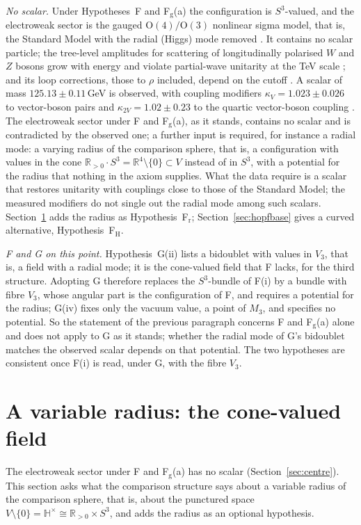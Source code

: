 \documentclass[aps,pra,onecolumn,superscriptaddress,nofootinbib,10pt]{revtex4-2}
\theoremstyle{definition}
\theoremstyle{remark}
\newcommand{\R}{\mathbb{R}}
\newcommand{\HH}{\mathbb{H}}
\newcommand{\OO}{\mathrm{O}}
\begin{document}
\smallskip\noindent\emph{No scalar.}  Under Hypotheses~F and F$_{\mathrm g}$(a) the configuration is $S^3$-valued, and the
electroweak sector is the gauged $\OO(4)/\OO(3)$ nonlinear sigma model, that is, the Standard Model with the
radial (Higgs) mode removed \cite{AB80}.  It contains no scalar particle; the tree-level amplitudes for
scattering of longitudinally polarised $W$ and $Z$ bosons grow with energy and violate partial-wave
unitarity at the TeV scale \cite{LQT77}; and its loop corrections, those to $\rho$ included, depend on the
cutoff \cite{AB80}.  A scalar of mass $125.13\pm0.11$\,GeV is observed, with coupling modifiers
$\kappa_V=1.023\pm0.026$ to vector-boson pairs and $\kappa_{2V}=1.02\pm0.23$ to the quartic vector-boson coupling
\cite{ex-PDG26}.  The electroweak sector under F and F$_{\mathrm g}$(a), as it stands, contains no scalar and is
contradicted by the observed one; a further input is required, for instance a radial mode: a varying
radius of the comparison sphere, that is, a configuration with values in the cone
$\R_{>0}\cdot S^3=\R^4\setminus\{0\}\subset V$ instead of in $S^3$, with a potential for the radius that nothing in the axiom
supplies.  What the data require is a scalar that restores unitarity with couplings close to those of the
Standard Model; the measured modifiers do not single out the radial mode among such scalars.  Section~\ref{sec:radial}
adds the radius as Hypothesis~F$_{\mathrm r}$; Section~\ref{sec:hopfbase} gives a curved alternative, Hypothesis~F$_{\mathrm H}$.

\smallskip\noindent\emph{F and G on this point.}  Hypothesis~G(ii) lists a bidoublet with values in $V_3$, that is,
a field with a radial mode; it is the cone-valued field that F lacks, for the third structure.  Adopting
G therefore replaces the $S^3$-bundle of F(i) by a bundle with fibre $V_3$, whose angular part is the
configuration of F, and requires a potential for the radius; G(iv) fixes only the vacuum value, a point of
$M_3$, and specifies no potential.  So the statement of the previous paragraph concerns F and F$_{\mathrm g}$(a)
alone and does not apply to G as it stands; whether the radial mode of G's bidoublet matches the
observed scalar depends on that potential.  The two hypotheses are consistent once F(i) is read, under
G, with the fibre $V_3$.


\section{A variable radius: the cone-valued field}\label{sec:radial}
The electroweak sector under F and F$_{\mathrm g}$(a) has no scalar (Section~\ref{sec:centre}).  This section
asks what the comparison structure says about a variable radius of the comparison sphere, that is,
about the punctured space $V\setminus\{0\}=\HH^\times\cong\R_{>0}\times S^3$, and adds the radius as an optional hypothesis.
\end{document}
